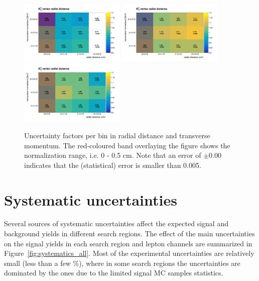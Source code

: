 \begin{figure}[h!]
	\centering	
	\includegraphics[width=0.45\textwidth]{Figures/c6/efficiencies/2dplots/2016tot/smallrange}
	\includegraphics[width=0.45\textwidth]{Figures/c6/efficiencies/2dplots/2017tot/smallrange}\\
	\includegraphics[width=0.45\textwidth]{Figures/c6/efficiencies/2dplots/2018tot/smallrange}
	\caption{Uncertainty factors per bin in radial distance and
          transverse momentum. The red-coloured band overlaying the
          figure shows the normalization range, i.e. 0 - 0.5 cm. Note
          that an error of $\pm 0.00$ indicates that the (statistical)
          error is smaller than 0.005. \luka}
	\label{fig:2dplots}
\end{figure}

\section{Systematic uncertainties}\label{sec:llsystematic}
Several sources of systematic uncertainties affect the expected signal
and background yields in different search regions. 
The effect of the main uncertainties on the signal yields in each
search region and lepton channels are summarized in
Figure~\ref{fig:systematics_all}. 
Most of the experimental uncertainties are relatively small (less than
a few \%), where in some search regions the uncertainties are
dominated by the ones due to the limited signal MC samples statistics. 

